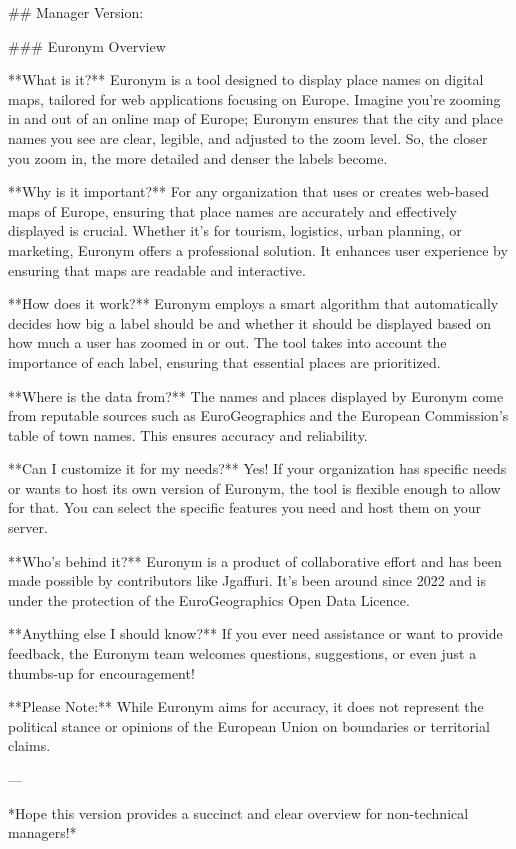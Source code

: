 ## Manager Version:

### Euronym Overview

**What is it?**
Euronym is a tool designed to display place names on digital maps, tailored for web applications focusing on Europe. Imagine you're zooming in and out of an online map of Europe; Euronym ensures that the city and place names you see are clear, legible, and adjusted to the zoom level. So, the closer you zoom in, the more detailed and denser the labels become.

**Why is it important?**
For any organization that uses or creates web-based maps of Europe, ensuring that place names are accurately and effectively displayed is crucial. Whether it's for tourism, logistics, urban planning, or marketing, Euronym offers a professional solution. It enhances user experience by ensuring that maps are readable and interactive.

**How does it work?**
Euronym employs a smart algorithm that automatically decides how big a label should be and whether it should be displayed based on how much a user has zoomed in or out. The tool takes into account the importance of each label, ensuring that essential places are prioritized.

**Where is the data from?**
The names and places displayed by Euronym come from reputable sources such as EuroGeographics and the European Commission's table of town names. This ensures accuracy and reliability.

**Can I customize it for my needs?**
Yes! If your organization has specific needs or wants to host its own version of Euronym, the tool is flexible enough to allow for that. You can select the specific features you need and host them on your server.

**Who's behind it?**
Euronym is a product of collaborative effort and has been made possible by contributors like Jgaffuri. It's been around since 2022 and is under the protection of the EuroGeographics Open Data Licence.

**Anything else I should know?**
If you ever need assistance or want to provide feedback, the Euronym team welcomes questions, suggestions, or even just a thumbs-up for encouragement!

**Please Note:**
While Euronym aims for accuracy, it does not represent the political stance or opinions of the European Union on boundaries or territorial claims.

---

*Hope this version provides a succinct and clear overview for non-technical managers!*